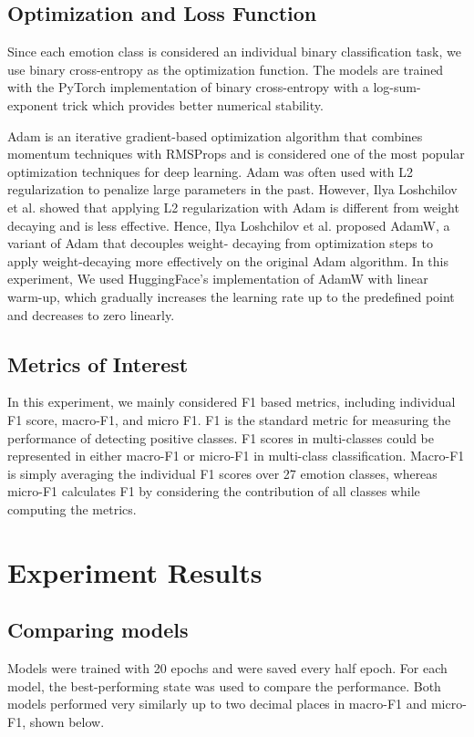\documentclass[conference]{IEEEtran}
\begin{document}
\subsection{Optimization and Loss Function}

Since each emotion class is considered an individual binary classification task, we use binary cross-entropy as the optimization function. The models are trained with the PyTorch implementation of binary cross-entropy with a log-sum-exponent trick which provides better numerical stability\cite{NEURIPS2019_9015}. 

Adam\cite{https://doi.org/10.48550/arxiv.1412.6980} is an iterative gradient-based optimization algorithm that combines momentum techniques with RMSProps and is considered one of the most popular optimization techniques for deep learning. Adam was often used with L2 regularization to penalize large parameters in the past. However, Ilya Loshchilov et al. showed that applying L2 regularization with Adam is different from weight decaying and is less effective\cite{DBLP:journals/corr/abs-1711-05101}. Hence, Ilya Loshchilov et al. proposed AdamW\cite{DBLP:journals/corr/abs-1711-05101}, a variant of Adam that decouples weight- decaying from optimization steps to apply weight-decaying more effectively on the original Adam algorithm. In this experiment, We used HuggingFace's implementation of AdamW with linear warm-up, which gradually increases the learning rate up to the predefined point and decreases to zero linearly\cite{Wolf_Transformers_State-of-the-Art_Natural_2020}. 

\subsection{Metrics of Interest}
In this experiment, we mainly considered F1 based metrics, including individual F1 score, macro-F1, and micro F1. F1 is the standard metric for measuring the performance of detecting positive classes. F1 scores in multi-classes could be represented in either macro-F1 or micro-F1 in multi-class classification. Macro-F1 is simply averaging the individual F1 scores over 27 emotion classes, whereas micro-F1 calculates F1 by considering the contribution of all classes while computing the metrics.

\section{Experiment Results}
\subsection{Comparing models}
Models were trained with 20 epochs and were saved every half epoch. For each model, the best-performing state was used to compare the performance. Both models performed very similarly up to two decimal places in macro-F1 and micro-F1, shown below.   
\end{document}
